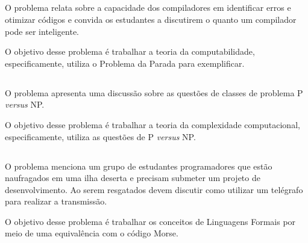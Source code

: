 \subsection{\ProblemaE}
O problema relata sobre a capacidade dos compiladores
em identificar erros e otimizar códigos e convida os
estudantes a discutirem o quanto um compilador
pode ser inteligente.

O objetivo desse problema é trabalhar a teoria da
computabilidade, especificamente, utiliza o Problema
da Parada para exemplificar.

\subsection{\ProblemaF}
O problema apresenta uma discussão sobre as questões
de classes de problema P \textit{versus} NP.

O objetivo desse problema é trabalhar a teoria da complexidade
computacional, especificamente, utiliza as questões de
P \textit{versus} NP.

\subsection{\ProblemaG}
O problema menciona um grupo de estudantes programadores que
estão naufragados em uma ilha deserta e precisam submeter
um projeto de desenvolvimento. Ao serem resgatados devem
discutir como utilizar um telégrafo para realizar
a transmissão.

O objetivo desse problema é trabalhar os conceitos de
Linguagens Formais por meio de uma equivalência com
o código Morse.

\subsection{\ProblemaH}

\subsection{\ProblemaI}
